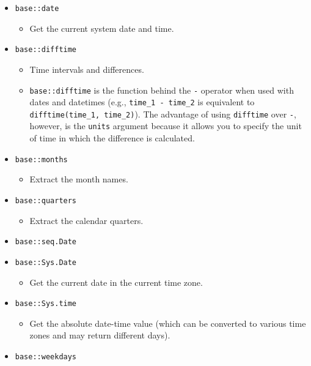 \documentclass[
]{book}
\providecommand{\tightlist}{%
  \setlength{\itemsep}{0pt}\setlength{\parskip}{0pt}}
\begin{document}
\begin{itemize}
\tightlist
\item
  \texttt{base::date}

  \begin{itemize}
  \tightlist
  \item
    Get the current system date and time.
  \end{itemize}
\item
  \texttt{base::difftime}

  \begin{itemize}
  \tightlist
  \item
    Time intervals and differences.
  \item
    \texttt{base::difftime} is the function behind the \texttt{-} operator when used with dates and datetimes (e.g., \texttt{time\_1\ -\ time\_2} is equivalent to \texttt{difftime(time\_1,\ time\_2)}). The advantage of using \texttt{difftime} over \texttt{-}, however, is the \texttt{units} argument because it allows you to specify the unit of time in which the difference is calculated.
  \end{itemize}
\item
  \texttt{base::months}

  \begin{itemize}
  \tightlist
  \item
    Extract the month names.
  \end{itemize}
\item
  \texttt{base::quarters}

  \begin{itemize}
  \tightlist
  \item
    Extract the calendar quarters.
  \end{itemize}
\item
  \texttt{base::seq.Date}
\item
  \texttt{base::Sys.Date}

  \begin{itemize}
  \tightlist
  \item
    Get the current date in the current time zone.
  \end{itemize}
\item
  \texttt{base::Sys.time}

  \begin{itemize}
  \tightlist
  \item
    Get the absolute date-time value (which can be converted to various time zones and may return different days).
  \end{itemize}
\item
  \texttt{base::weekdays}


\end{itemize}
\end{document}
